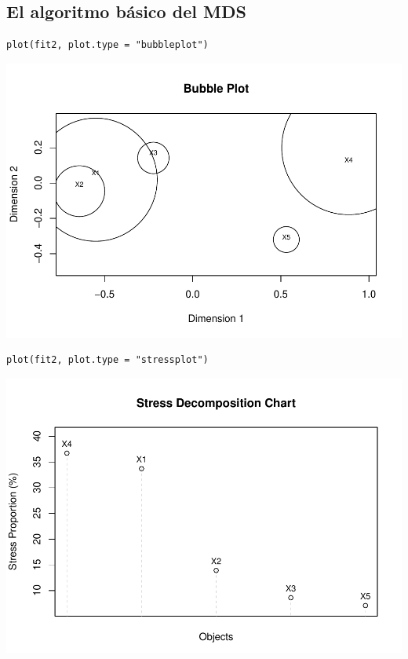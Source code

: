 \documentclass[]{article}
\begin{document}
\subsection{El algoritmo básico del
MDS}\label{el-algoritmo-buxe1sico-del-mds-10}

\hypertarget{left}{}
\begin{verbatim}
plot(fit2, plot.type = "bubbleplot")
\end{verbatim}

\includegraphics{Clase-4_files/figure-latex/unnamed-chunk-13-1.pdf}

\begin{verbatim}
plot(fit2, plot.type = "stressplot")
\end{verbatim}

\includegraphics{Clase-4_files/figure-latex/unnamed-chunk-14-1.pdf}
\end{document}
